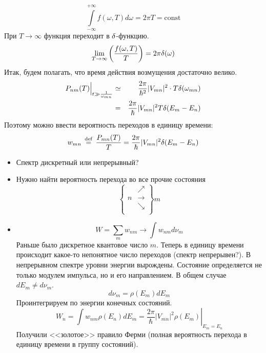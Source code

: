 $$
    \int\limits_{-\infty}^{+\infty} f(\omega, T) d\omega = 2 \pi T = \textrm{const}
$$
При $T \to \infty$ функция переходит в $\delta$-функцию.
$$
    \underset{T \to \infty}\lim \left(
        \dfrac{f(\omega, T)}{T}
    \right) = 2 \pi \delta(\omega)
$$
Итак, будем полагать, что время действия возмущения достаточно велико.
\begin{eqnarray*}
    P_{nm} (T) \Big|_{t \gg \frac{1}{\omega_{mn}}} &\simeq& \dfrac{2 \pi}{\hbar^2} |V_{mn}|^2 \cdot T \delta(\omega_{mn})\\
&=& \dfrac{2\pi}{\hbar} |V_{mn}|^2 T \delta (E_m - E_n)
\end{eqnarray*}
Поэтому можно ввести вероятность переходов в единицу времени:
$$
    w_{mn} \,\overset{\mathrm{def}}{=}\, \dfrac{P_{mn} (T)}{T} = \dfrac{2\pi}{\hbar} |V_{mn}|^2 \delta (E_m - E_n)
$$
\begin{itemize}
  \item Спектр дискретный или непрерывный?
  \item Нужно найти вероятность перехода во все прочие состояния
$$
    \left\{
    \begin{array}{rl}
        & \nearrow \\
      n & \rightarrow \\
        & \searrow \\
    \end{array}
    \right\} m
$$
  \item $$
    W = \sum_m w_{nm} \to \int w_{nm} d \nu_m
$$
Раньше было дискретное квантовое число $m$. Теперь в единицу времени происходит какое-то непонятное число переходов (спектр непрерывен?). В непрерывном спектре уровни энергии вырождены. Состояние определяется не только модулем импульса, но и его направлением. В общем случае $dE_m \ne d \nu_m$.
$$
    d \nu_m = \rho(E_m) dE_m
$$
Проинтегрируем по энергии конечных состояний.
$$
    W_n = \int w_{nm} \rho(E_n) dE_m = \left.\dfrac{2\pi}{\hbar} |V_{mn}|^2 \rho (E_m) \right|_{E_m = E_n}
$$
Получили <<золотое>> правило Ферми (полная вероятность перехода в единицу времени в группу состояний).
\end{itemize}

